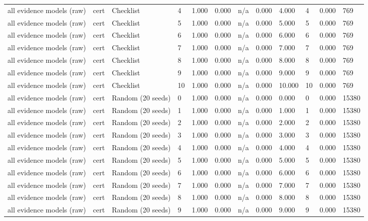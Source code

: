 \begin{table}[!ht]
{\begin{tabular}{llllllllllll}
all evidence models (raw) & cert & Checklist & 4 & 1.000 & 0.000 & n/a & 0.000 & 4.000 & 4 & 0.000 & 769 \\
all evidence models (raw) & cert & Checklist & 5 & 1.000 & 0.000 & n/a & 0.000 & 5.000 & 5 & 0.000 & 769 \\
all evidence models (raw) & cert & Checklist & 6 & 1.000 & 0.000 & n/a & 0.000 & 6.000 & 6 & 0.000 & 769 \\
all evidence models (raw) & cert & Checklist & 7 & 1.000 & 0.000 & n/a & 0.000 & 7.000 & 7 & 0.000 & 769 \\
all evidence models (raw) & cert & Checklist & 8 & 1.000 & 0.000 & n/a & 0.000 & 8.000 & 8 & 0.000 & 769 \\
all evidence models (raw) & cert & Checklist & 9 & 1.000 & 0.000 & n/a & 0.000 & 9.000 & 9 & 0.000 & 769 \\
all evidence models (raw) & cert & Checklist & 10 & 1.000 & 0.000 & n/a & 0.000 & 10.000 & 10 & 0.000 & 769 \\
all evidence models (raw) & cert & Random (20 seeds) & 0 & 1.000 & 0.000 & n/a & 0.000 & 0.000 & 0 & 0.000 & 15380 \\
all evidence models (raw) & cert & Random (20 seeds) & 1 & 1.000 & 0.000 & n/a & 0.000 & 1.000 & 1 & 0.000 & 15380 \\
all evidence models (raw) & cert & Random (20 seeds) & 2 & 1.000 & 0.000 & n/a & 0.000 & 2.000 & 2 & 0.000 & 15380 \\
all evidence models (raw) & cert & Random (20 seeds) & 3 & 1.000 & 0.000 & n/a & 0.000 & 3.000 & 3 & 0.000 & 15380 \\
all evidence models (raw) & cert & Random (20 seeds) & 4 & 1.000 & 0.000 & n/a & 0.000 & 4.000 & 4 & 0.000 & 15380 \\
all evidence models (raw) & cert & Random (20 seeds) & 5 & 1.000 & 0.000 & n/a & 0.000 & 5.000 & 5 & 0.000 & 15380 \\
all evidence models (raw) & cert & Random (20 seeds) & 6 & 1.000 & 0.000 & n/a & 0.000 & 6.000 & 6 & 0.000 & 15380 \\
all evidence models (raw) & cert & Random (20 seeds) & 7 & 1.000 & 0.000 & n/a & 0.000 & 7.000 & 7 & 0.000 & 15380 \\
all evidence models (raw) & cert & Random (20 seeds) & 8 & 1.000 & 0.000 & n/a & 0.000 & 8.000 & 8 & 0.000 & 15380 \\
all evidence models (raw) & cert & Random (20 seeds) & 9 & 1.000 & 0.000 & n/a & 0.000 & 9.000 & 9 & 0.000 & 15380 \\

\end{tabular}}
\end{table}

